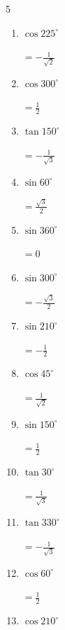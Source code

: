 \begin{multicols}{5}
\begin{enumerate}
        $\displaystyle =-\frac{1}{\sqrt{2}}$

  \item $\displaystyle \cos{225^\circ}$

        $\displaystyle =-\frac{1}{\sqrt{2}}$

  \item $\displaystyle \cos{300^\circ}$

        $\displaystyle =\frac{1}{2}$

  \item $\displaystyle \tan{150^\circ}$

        $\displaystyle =-\frac{1}{\sqrt{3}}$

  \item $\displaystyle \sin{60^\circ}$

        $\displaystyle =\frac{\sqrt{3}}{2}$

  \item $\displaystyle \sin{360^\circ}$

        $\displaystyle =0$

\columnbreak %

  \item $\displaystyle \sin{300^\circ}$

        $\displaystyle =-\frac{\sqrt{3}}{2}$

  \item $\displaystyle \sin{210^\circ}$

        $\displaystyle =-\frac{1}{2}$

  \item $\displaystyle \cos{45^\circ}$

        $\displaystyle =\frac{1}{\sqrt{2}}$

  \item $\displaystyle \sin{150^\circ}$

        $\displaystyle =\frac{1}{2}$

  \item $\displaystyle \tan{30^\circ}$

        $\displaystyle =\frac{1}{\sqrt{3}}$

  \item $\displaystyle \tan{330^\circ}$

        $\displaystyle =-\frac{1}{\sqrt{3}}$

  \item $\displaystyle \cos{60^\circ}$

        $\displaystyle =\frac{1}{2}$

  \item $\displaystyle \cos{210^\circ}$


\end{enumerate}
\end{multicols}
